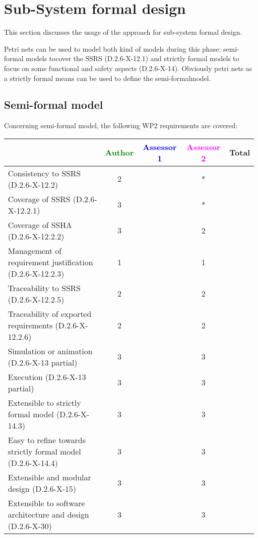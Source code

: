 \section{Sub-System formal design}
This section discusses the usage of the approach for sub-system formal design.

Petri nets can be used to model both kind of models during this phase: semi-formal models tocover the SSRS (D.2.6-X-12.1) and strictly formal  models to  focus on some functional and safety aspects (D.2.6-X-14).  Obviously petri nets as a strictly  formal means can be used to define the semi-formalmodel.

\subsection{Semi-formal model}

Concerning semi-formal model, the following WP2 requirements are covered:

\begin{tabular}{|l | c | c | c | c|}
\hline
& \textcolor{green}{Author} & \textcolor{blue}{Assessor 1} & \textcolor{magenta}{Assessor 2} & Total \\
\hline 
Consistency to SSRS (D.2.6-X-12.2) & 2 & & * &  \\
\hline
Coverage of SSRS (D.2.6-X-12.2.1)  & 3 & & * &  \\
\hline
Coverage of SSHA (D.2.6-X-12.2.2)  & 3 & & 2 &  \\
\hline
Management of requirement justification (D.2.6-X-12.2.3)  & 1 & & 1 &  \\
\hline
Traceability to  SSRS (D.2.6-X-12.2.5)  & 2 & & 2 &  \\
\hline
Traceability of exported requirements (D.2.6-X-12.2.6)  & 2 & & 2 &  \\
\hline
Simulation or animation (D.2.6-X-13 partial)  & 3 & & 3 &  \\
\hline
Execution (D.2.6-X-13 partial)  & 3 & & 3 &  \\
\hline
Extensible to strictly formal model (D.2.6-X-14.3) & 3 & & 3 &  \\
\hline
Easy to  refine towards strictly formal model (D.2.6-X-14.4) & 3 & & 3 &  \\
\hline
Extensible and modular design (D.2.6-X-15)  & 3 & & 3 &  \\
\hline
Extensible to software architecture and design (D.2.6-X-30)   & 3 & & 3 &  \\
\hline
\end{tabular}

